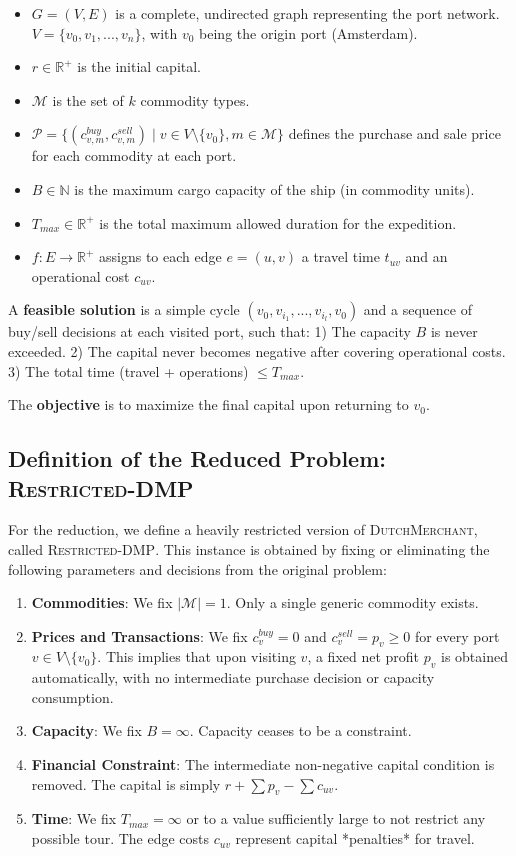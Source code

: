 \documentclass{article} \usepackage[english]{babel} \usepackage[utf8]{inputenc}
\begin{document}
\begin{itemize} \item $G=(V, E)$ is a complete, undirected graph representing
the port network. $V = \{v_0, v_1, ..., v_n\}$, with $v_0$ being the origin port
(Amsterdam). \item $r \in \mathbb{R}^+$ is the initial capital. \item
$\mathcal{M}$ is the set of $k$ commodity types. \item $\mathcal{P} = \{
(c^{buy}_{v,m}, c^{sell}_{v,m}) \mid v \in V \setminus \{v_0\}, m \in
\mathcal{M} \}$ defines the purchase and sale price for each commodity at each
port. \item $B \in \mathbb{N}$ is the maximum cargo capacity of the ship (in
commodity units). \item $T_{max} \in \mathbb{R}^+$ is the total maximum allowed
duration for the expedition. \item $f: E \rightarrow \mathbb{R}^+$ assigns to
each edge $e=(u,v)$ a travel time $t_{uv}$ and an operational cost $c_{uv}$.
\end{itemize}

A \textbf{feasible solution} is a simple cycle $(v_0, v_{i_1}, ..., v_{i_l},
v_0)$ and a sequence of buy/sell decisions at each visited port, such that: 1)
The capacity $B$ is never exceeded. 2) The capital never becomes negative after
covering operational costs. 3) The total time (travel + operations) $\leq
T_{max}$.

The \textbf{objective} is to maximize the final capital upon returning to $v_0$.

\subsection{Definition of the Reduced Problem: \textsc{Restricted-DMP}}
\label{subsec:def_dmp_rest}

For the reduction, we define a heavily restricted version of
\textsc{DutchMerchant}, called \textsc{Restricted-DMP}. This instance is
obtained by fixing or eliminating the following parameters and decisions from
the original problem:

\begin{enumerate} \item \textbf{Commodities}: We fix $|\mathcal{M}| = 1$. Only
a single generic commodity exists. \item \textbf{Prices and Transactions}: We
fix $c^{buy}_{v} = 0$ and $c^{sell}_{v} = p_v \geq 0$ for every port $v \in V
\setminus \{v_0\}$. This implies that upon visiting $v$, a fixed net profit
$p_v$ is obtained automatically, with no intermediate purchase decision or
capacity consumption. \item \textbf{Capacity}: We fix $B = \infty$. Capacity
ceases to be a constraint. \item \textbf{Financial Constraint}: The intermediate
non-negative capital condition is removed. The capital is simply $r + \sum p_v -
\sum c_{uv}$. \item \textbf{Time}: We fix $T_{max} = \infty$ or to a value
sufficiently large to not restrict any possible tour. The edge costs $c_{uv}$
represent capital *penalties* for travel. \end{enumerate}
\end{document}
